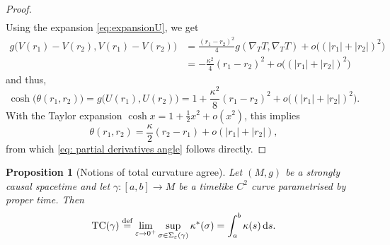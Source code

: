 \documentclass[hidelinks,12pt,a4paper]{article}
\numberwithin{equation}{section}
\theoremstyle{plain}
\newtheorem{proposition}[definition]{Proposition}
\theoremstyle{definition}
\newcommand{\eps}{\varepsilon}
\begin{document}
\begin{proof}
\begin{align*}
\end{align*}
Using the expansion \eqref{eq:expansionU}, we get
\begin{align*}
g\big(V(r_1) - V(r_2), V(r_1) - V(r_2)\big) &= \frac{(r_1-r_2)^2}{4}g(\nabla_T T, \nabla_T T) + o\bigl((|r_1| + |r_2|)^2\bigr) \\
&= -\frac{\kappa^2}{4}(r_1-r_2)^2 + o\bigl((|r_1| + |r_2|)^2\bigr)
\end{align*}
and thus,
\begin{equation*}
\cosh \bigl(\theta(r_1,r_2)\bigr) =g\big(U(r_1), U(r_2)\big) = 1 +\frac{\kappa^2}{8}(r_1-r_2)^2 + o\bigl((|r_1| + |r_2|)^2\bigr).
\end{equation*}
With the Taylor expansion $\cosh{x} = 1 +\tfrac{1}{2}x^2 + o(x^2)$, this implies
\begin{equation*}
\theta(r_1,r_2) = \frac{\kappa}{2}(r_2-r_1) + o(|r_1|+|r_2|), 
\end{equation*}
from which \eqref{eq: partial derivatives angle} follows directly. 
\end{proof}

\begin{proposition}[Notions of total curvature agree]
\label{propcoin}
Let $(M,g)$ be a strongly causal spacetime and let $\gamma\colon  [a,b]\rightarrow M$ be a timelike $C^2$ curve parametrised by proper time. 
Then
\begin{equation*}
\mathrm {TC}(\gamma)\stackrel{\textnormal{def}}{=}\lim_{\eps\to 0^+}\sup_{\sigma\in\Sigma_\eps(\gamma)}\kappa^*(\sigma)=\int_a^b \kappa(s) \,\mathrm{d}s.
\end{equation*}
\end{proposition}
\end{document}
